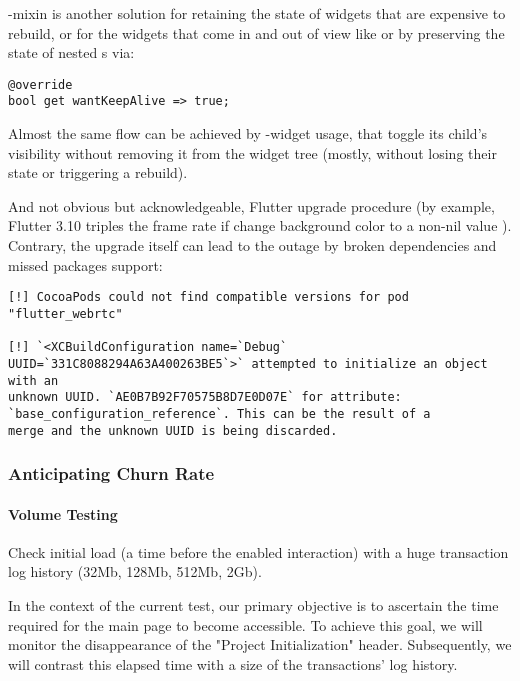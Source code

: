 -mixin is another solution for retaining the state of widgets that are expensive to 
rebuild, or for the widgets that come in and out of view like  or  by preserving the state of
nested s via:

\begin{lstlisting}
@override
bool get wantKeepAlive => true;
\end{lstlisting}

\noindent Almost the same flow can be achieved by -widget usage, that toggle its child's visibility without 
removing it from the widget tree (mostly, without losing their state or triggering a rebuild).

And not obvious but acknowledgeable, Flutter upgrade procedure (by example, Flutter 3.10 triples the frame rate if 
change  background color to a non-nil value \cite{Chis23}). Contrary, the upgrade itself can lead to 
the outage by broken dependencies and missed packages support:

\begin{lstlisting}
[!] CocoaPods could not find compatible versions for pod "flutter_webrtc"

[!] `<XCBuildConfiguration name=`Debug` UUID=`331C8088294A63A400263BE5`>` attempted to initialize an object with an 
unknown UUID. `AE0B7B92F70575B8D7E0D07E` for attribute: `base_configuration_reference`. This can be the result of a 
merge and the unknown UUID is being discarded.
\end{lstlisting}


\subsubsection{Anticipating Churn Rate}
\paragraph{Volume Testing}
Check initial load (a time before the enabled interaction) with a huge transaction log history (32Mb, 128Mb, 
512Mb, 2Gb).

In the context of the current test, our primary objective is to ascertain the time required for the main page to 
become accessible. To achieve this goal, we will monitor the disappearance of the "Project Initialization" header. 
Subsequently, we will contrast this elapsed time with a size of the transactions' log history.

